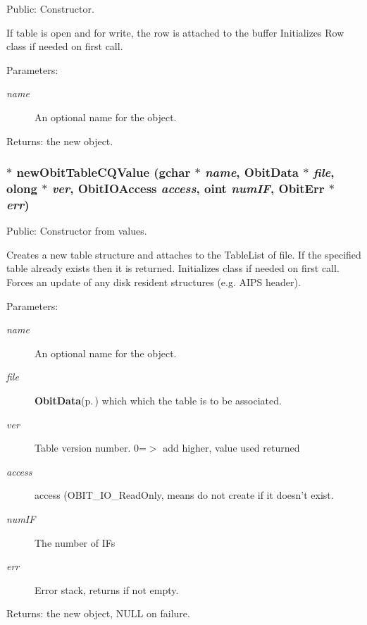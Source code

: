 Public: Constructor. 

If table is open and for write, the row is attached to the buffer Initializes Row class if needed on first call. \begin{Desc}
\item[Parameters:]
\begin{description}
\item[{\em name}]An optional name for the object. \end{description}
\end{Desc}
\begin{Desc}
\item[Returns:]the new object. \end{Desc}
\subsubsection{$\ast$ new\-Obit\-Table\-CQValue (gchar $\ast$ {\em name}, {\bf Obit\-Data} $\ast$ {\em file}, {\bf olong} $\ast$ {\em ver}, Obit\-IOAccess {\em access}, {\bf oint} {\em num\-IF}, {\bf Obit\-Err} $\ast$ {\em err})}\label{ObitTableCQ_8h_a12}


Public: Constructor from values. 

Creates a new table structure and attaches to the Table\-List of file. If the specified table already exists then it is returned. Initializes class if needed on first call. Forces an update of any disk resident structures (e.g. AIPS header). \begin{Desc}
\item[Parameters:]
\begin{description}
\item[{\em name}]An optional name for the object. \item[{\em file}]{\bf Obit\-Data}{\rm (p.\,\pageref{structObitData})} which which the table is to be associated. \item[{\em ver}]Table version number. 0=$>$ add higher, value used returned \item[{\em access}]access (OBIT\_\-IO\_\-Read\-Only, means do not create if it doesn't exist. \item[{\em num\-IF}]The number of IFs \item[{\em err}]Error stack, returns if not empty. \end{description}
\end{Desc}
\begin{Desc}
\item[Returns:]the new object, NULL on failure. \end{Desc}
